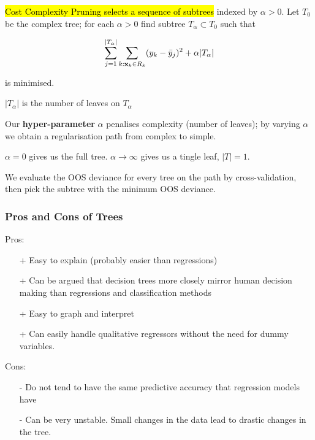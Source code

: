 \documentclass[11pt]{article}
\begin{document}
\begin{definition}
    \hl{Cost Complexity Pruning selects a sequence of subtrees} indexed by $\alpha>0$. Let $T_0$ be the complex tree; for each $\alpha>0$ find subtree $T_\alpha\subset T_0$ such that

    \begin{equation}
        \sum_{j=1}^{|T_\alpha|}\sum_{k:\mathbf{x}_k\in R_k}(y_k - \Bar{y}_j)^2 + \alpha|T_\alpha|
    \end{equation}

    is minimised.

    \begin{note}
        $|T_\alpha|$ is the number of leaves on $T_\alpha$
    \end{note}

    Our \textbf{hyper-parameter} $\alpha$ penalises complexity (number of leaves); by varying $\alpha$ we obtain a regularisation path from complex to simple.

    \begin{note}
        $\alpha=0$ gives us the full tree. $\alpha\rightarrow\infty$ gives us a tingle leaf, $|T| = 1$.
    \end{note}

    We evaluate the OOS deviance for every tree on the path by cross-validation, then pick the subtree with the minimum OOS deviance.
\end{definition}



\subsubsection{Pros and Cons of Trees}

\begin{shaded}
    Pros:
    \begin{itemize}
        \item[+] Easy to explain (probably easier than regressions)
        \item[+] Can be argued that decision trees more closely mirror human decision making than regressions and classification methods
        \item[+] Easy to graph and interpret
        \item[+] Can easily handle qualitative regressors without the need for dummy variables.
    \end{itemize}

    Cons:
    \begin{itemize}
        \item[-] Do not tend to have the same predictive accuracy that regression models have 
        \item[-] Can be very unstable. Small changes in the data lead to drastic changes in the tree.
    \end{itemize}
\end{shaded}
\end{document}
